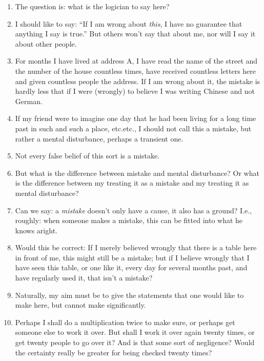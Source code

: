 \documentclass{book}
\begin{document}
\begin{enumerate}
\item
The question is: what is the logician to say here?

\item
I should like to say: ``If I am wrong about \emph{this}, I have no guarantee
that anything I say is true.'' But others won't say that about me, nor will I
say it about other people.

\item
For months I have lived at address A, I have read the name of the street and
the number of the house countless times, have received countless letters here
and given countless people the address. If I am wrong about it, the mistake is
hardly less that if I were (wrongly) to believe I was writing Chinese and not
German.

\item
If my friend were to imagine one day that he had been living for a long time
past in such and such a place, etc.etc., I should not call this a mistake, but
rather a mental disturbance, perhaps a transient one.

\item
Not every false belief of this sort is a mistake.

\item
But what is the difference between mistake and mental disturbance? Or what is
the difference between my treating it as a mistake and my treating it as mental
disturbance?

\item
Can we say: a \emph{mistake} doesn't only have a cause, it also has a ground?
I.e., roughly: when someone makes a mistake, this can be fitted into what he
knows aright.

\item
Would this be correct: If I merely believed wrongly that there is a table here
in front of me, this might still be a mistake; but if I believe wrongly that I
have seen this table, or one like it, every day for several months past, and
have regularly used it, that isn't a mistake?

\item
Naturally, my aim must be to give the statements that one would like to make
here, but cannot make significantly.

\item
Perhaps I shall do a multiplication twice to make sure, or perhaps get someone
else to work it over. But shall I work it over again twenty times, or get
twenty people to go over it? And is that some sort of negligence? Would the
certainty really be greater for being checked twenty times?


\end{enumerate}
\end{document}
